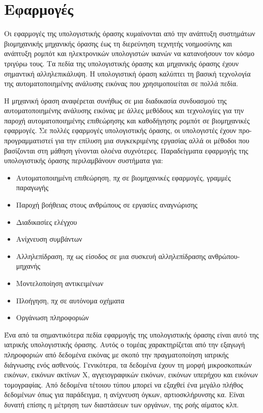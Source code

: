 \section{Εφαρμογές}

Οι εφαρμογές της υπολογιστικής όρασης κυμαίνονται από την ανάπτυξη συστημάτων βιομηχανικής μηχανικής όρασης έως τη διερεύνηση τεχνητής νοημοσύνης και ανάπτυξη ρομπότ και ηλεκτρονικών υπολογιστών ικανών να κατανοήσουν τον κόσμο τριγύρω τους. Τα πεδία της υπολογιστικής όρασης και μηχανικής όρασης έχουν σημαντική αλληλεπικάλυψη. Η υπολογιστική όραση καλύπτει τη βασική τεχνολογία της αυτοματοποιημένης ανάλυσης εικόνας που χρησιμοποιείται σε πολλά πεδία.

Η μηχανική όραση αναφέρεται συνήθως σε μια διαδικασία συνδυασμού της αυτοματοποιημένης ανάλυσης εικόνας με άλλες μεθόδους και τεχνολογίες για την παροχή αυτοματοποιημένης επιθεώρησης και καθοδήγησης ρομπότ σε βιομηχανικές εφαρμογές. Σε πολλές εφαρμογές υπολογιστικής όρασης, οι υπολογιστές έχουν προ-προγραμματιστεί για την επίλυση μια συγκεκριμένης εργασίας αλλά οι μέθοδοι που βασίζονται στη μάθηση γίνονται ολοένα συχνότερες. Παραδείγματα εφαρμογής της υπολογιστικής όρασης περιλαμβάνουν συστήματα για:
\begin{itemize}
	\item Αυτοματοποιημένη επιθεώρηση, πχ σε βιομηχανικές εφαρμογές, γραμμές παραγωγής
	\item Παροχή βοήθειας στους ανθρώπους σε εργασίες αναγνώρισης
	\item Διαδικασίες ελέγχου
	\item Ανίχνευση συμβάντων
	\item Αλληλεπίδραση, πχ ως είσοδος σε μια συσκευή αλληλεπίδρασης ανθρώπου-μηχανής
	\item Μοντελοποίηση αντικειμένων
	\item Πλοήγηση, πχ σε αυτόνομα οχήματα
	\item Οργάνωση πληροφοριών \\
\end{itemize}

Ένα από τα σημαντικότερα πεδία εφαρμογής της υπολογιστικής όρασης είναι αυτό της ιατρικής υπολογιστικής όρασης. Αυτός ο τομέας χαρακτηρίζεται από την εξαγωγή πληροφοριών από δεδομένα εικόνας με σκοπό την πραγματοποίηση ιατρικής διάγνωσης ενός ασθενούς. Γενικότερα, τα δεδομένα έχουν τη μορφή μικροσκοπικών εικόνων, εικόνων ακτίνων X, αγγειογραφικών εικόνων, εικόνων υπερήχου και εικόνων τομογραφίας. Από δεδομένα τέτοιου τύπου μπορεί να εξαχθεί ένα μεγάλο πλήθος δεδομένων όπως για παράδειγμα, η ανίχνευση όγκων, αρτιοσκλήρυνσης κα. Είναι δυνατή επίσης η μέτρηση των διαστάσεων των οργάνων, της ροής αίματος κλπ.


